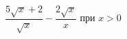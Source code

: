 \begin{ex}
	\begin{condition}
		\( \dfrac{5\sqrt{x}+2}{\sqrt{x}}-\dfrac{2\sqrt{x}}{x} \) при \( x>0 \)
	\end{condition}
\end{ex}